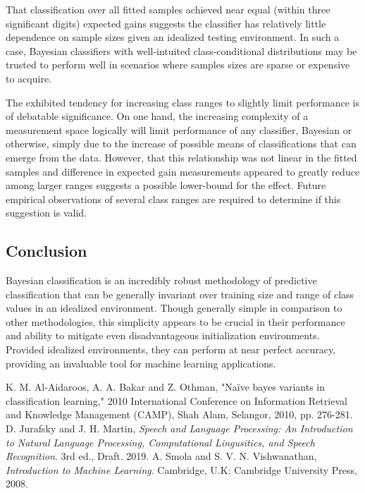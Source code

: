 \documentclass[10pt, conference]{IEEEtran}
\begin{document}
That classification over all fitted samples achieved near equal (within three significant digits) expected gains suggests the classifier has relatively little dependence on sample sizes given an idealized testing environment. In such a case, Bayesian classifiers with well-intuited class-conditional distributions may be trusted to perform well in scenarios where samples sizes are sparse or expensive to acquire. 

The exhibited tendency for increasing class ranges to slightly limit performance is of debatable significance. On one hand, the increasing complexity of a measurement space logically will limit performance of any classifier, Bayesian or otherwise, simply due to the increase of possible means of classifications that can emerge from the data. However, that this relationship was not linear in the fitted samples and difference in expected gain measurements appeared to greatly reduce among larger ranges suggests a possible lower-bound for the effect. Future empirical observations of several class ranges are required to determine if this suggestion is valid.
\subsection{Conclusion}
Bayesian classification is an incredibly robust methodology of predictive classification that can be generally invariant over training size and range of class values in an idealized environment. Though generally simple in comparison to other methodologies, this simplicity appears to be crucial in their performance and ability to mitigate even disadvantageous initialization environments. Provided idealized environments, they can perform at near perfect accuracy, providing an invaluable tool for machine learning applications.
\begin{thebibliography}{00}
K. M. Al-Aidaroos, A. A. Bakar and Z. Othman, "Naïve bayes variants in classification learning," 2010 International Conference on Information Retrieval and Knowledge Management (CAMP), Shah Alam, Selangor, 2010, pp. 276-281.
 D. Jurafsky and J. H. Martin, \textit{Speech and Language Processing: An Introduction to Natural Language Processing, Computational Lingusitics, and Speech Recognition}. 3rd ed., Draft. 2019.
 A. Smola and S. V. N. Vishwanathan, \textit{Introduction to Machine Learning}. Cambridge, U.K: Cambridge University Press, 2008.
\end{thebibliography}
\end{document}
